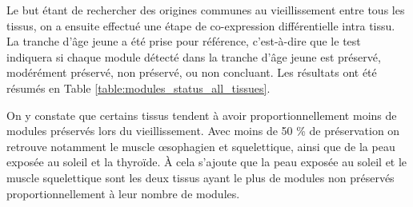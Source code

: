 Le but étant de rechercher des origines communes au vieillissement entre tous les tissus, on a ensuite effectué une étape de co-expression différentielle intra tissu. La tranche d'âge jeune a été prise pour référence, c’est-à-dire que le test indiquera si chaque module détecté dans la tranche d'âge jeune est préservé, modérément préservé, non préservé, ou non concluant. Les résultats ont été résumés en Table \ref{table:modules_status_all_tissues}. 

On y constate que certains tissus tendent à avoir proportionnellement moins de modules préservés lors du vieillissement. Avec moins de 50 \% de préservation on retrouve notamment le muscle œsophagien et squelettique, ainsi que de la peau exposée au soleil et la thyroïde. À cela s'ajoute que la peau exposée au soleil et le muscle squelettique sont les deux tissus ayant le plus de modules non préservés proportionnellement à leur nombre de modules.

